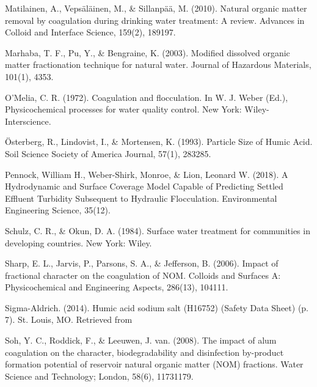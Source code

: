 \documentclass[letterpaper,10pt,english]{sphinxmanual}
\begin{document}
Matilainen, A., Vepsäläinen, M., \& Sillanpää, M. (2010). Natural organic matter removal by coagulation during drinking water treatment: A review. Advances in Colloid and Interface Science, 159(2), 189\textendash{}197. 

Marhaba, T. F., Pu, Y., \& Bengraine, K. (2003). Modified dissolved organic matter fractionation technique for natural water. Journal of Hazardous Materials, 101(1), 43\textendash{}53. 

O’Melia, C. R. (1972). Coagulation and flocculation. In W. J. Weber (Ed.), Physicochemical processes for water quality control. New York: Wiley-Interscience.

Österberg, R., Lindovist, I., \& Mortensen, K. (1993). Particle Size of Humic Acid. Soil Science Society of America Journal, 57(1), 283\textendash{}285. 

Pennock, William H., Weber-Shirk, Monroe, \& Lion, Leonard W. (2018). A Hydrodynamic and Surface Coverage Model Capable of Predicting Settled Effluent Turbidity Subsequent to Hydraulic Flocculation. Environmental Engineering Science, 35(12). 

Schulz, C. R., \& Okun, D. A. (1984). Surface water treatment for communities in developing countries. New York: Wiley.

Sharp, E. L., Jarvis, P., Parsons, S. A., \& Jefferson, B. (2006). Impact of fractional character on the coagulation of NOM. Colloids and Surfaces A: Physicochemical and Engineering Aspects, 286(1\textendash{}3), 104\textendash{}111. 

Sigma-Aldrich. (2014). Humic acid sodium salt (H16752) (Safety Data Sheet) (p. 7). St. Louis, MO. Retrieved from 

Soh, Y. C., Roddick, F., \& Leeuwen, J. van. (2008). The impact of alum coagulation on the character, biodegradability and disinfection by-product formation potential of reservoir natural organic matter (NOM) fractions. Water Science and Technology; London, 58(6), 1173\textendash{}1179. 
\end{document}
